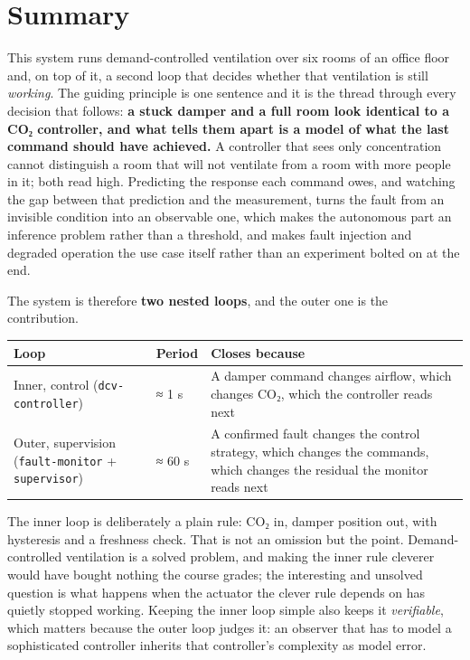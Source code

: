 \section{Summary}\label{sec:1}

This system runs demand-controlled ventilation over six rooms of an office floor and, on top of
it, a second loop that decides whether that ventilation is still \emph{working}. The guiding
principle is one sentence and it is the thread through every decision that follows: \textbf{a
stuck damper and a full room look identical to a CO₂ controller, and what tells them apart is a
model of what the last command should have achieved.} A controller that sees only concentration
cannot distinguish a room that will not ventilate from a room with more people in it; both read
high. Predicting the response each command owes, and watching the gap between that prediction and
the measurement, turns the fault from an invisible condition into an observable one, which makes
the autonomous part an inference problem rather than a threshold, and makes fault injection and
degraded operation the use case itself rather than an experiment bolted on at the end.

The system is therefore \textbf{two nested loops}, and the outer one is the contribution.

\begin{longtable}[]{@{}
  >{\raggedright\arraybackslash}p{}
  >{\raggedright\arraybackslash}p{}
  >{\raggedright\arraybackslash}p{}@{}}
\toprule
\textbf{Loop} & \textbf{Period} & \textbf{Closes because} \\
\midrule
\endhead
Inner, control (\texttt{dcv-controller}) & ≈ 1 s & A damper command changes airflow, which
changes CO₂, which the controller reads next \\
Outer, supervision (\texttt{fault-monitor} + \texttt{supervisor}) & ≈ 60 s & A confirmed fault
changes the control strategy, which changes the commands, which changes the residual the monitor
reads next \\
\bottomrule
\end{longtable}

The inner loop is deliberately a plain rule: CO₂ in, damper position out, with hysteresis and a
freshness check. That is not an omission but the point. Demand-controlled ventilation is a solved
problem, and making the inner rule cleverer would have bought nothing the course grades; the
interesting and unsolved question is what happens when the actuator the clever rule depends on
has quietly stopped working. Keeping the inner loop simple also keeps it \emph{verifiable}, which
matters because the outer loop judges it: an observer that has to model a sophisticated
controller inherits that controller's complexity as model error.

